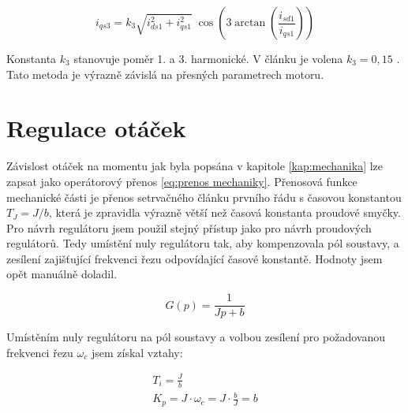 \begin{equation}
    \label{eq:iqs3 MTPV}
    i_{qs3} = k_3\sqrt{i_{ds1}^2 + i_{qs1}^2}\;\cos\!\left(3\arctan\!\left(\frac{i_{sd1}}{i_{qs1}}\right)\right)
\end{equation}

Konstanta $k_3$ stanovuje poměr 1. a 3. harmonické. V článku je volena $k_3 = 0{,}15$ \cite{fieldVeak}. Tato metoda je výrazně závislá na přesných parametrech motoru.


\section{Regulace otáček}
Závislost otáček na momentu jak byla popsána v kapitole \ref{kap:mechanika} lze zapsat jako operátorový přenos \ref{eq:prenos mechaniky}. Přenosová funkce mechanické části je přenos setrvačného článku prvního řádu s časovou konstantou $T_J = J/b$, která je zpravidla výrazně větší než časová konstanta proudové smyčky. Pro návrh regulátoru jsem použil stejný přístup jako pro návrh proudových regulátorů. Tedy umístění nuly regulátoru tak, aby kompenzovala pól soustavy, a zesílení zajišťující frekvenci řezu odpovídající časové konstantě. Hodnoty jsem opět manuálně doladil.

\begin{equation}
    \label{eq:prenos mechaniky}
    G(p) = \frac{1}{Jp + b}
\end{equation}

Umístěním nuly regulátoru na pól soustavy a volbou zesílení pro požadovanou frekvenci řezu $\omega_c$ jsem získal vztahy:

\begin{equation}
    \label{eq:konstanty reg otacky}
    \begin{gathered}
        T_i = \frac{J}{b} \\
        K_p = J \cdot \omega_c= J \cdot \frac{b}{J}=b
    \end{gathered}
\end{equation}

